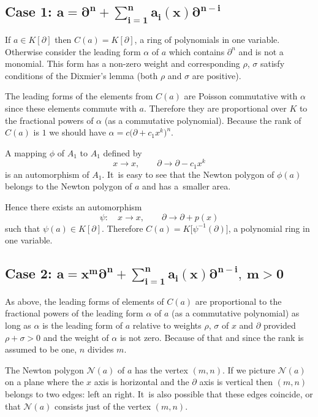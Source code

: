 \documentclass[pdftex]{sigma}
\numberwithin{equation}{section}
\newcommand{\de}{\partial}
\newcommand{\al}{\alpha}
\newcommand{\si}{\sigma}
\begin{document}
\subsection*{Case 1:
$\boldsymbol{\displaystyle a = \de^n + \sum\limits_{i=1}^n a_i(x)\de^{n-i}}$}

If $a \in K[\de]$ then $C(a) = K[\de]$, a ring of polynomials in one variable. Otherwise consider the leading form $\alpha$ of $a$ which contains $\de^n$ and is not a
monomial. This form has a non-zero weight and corresponding $\rho$, $\sigma$ satisfy conditions of the Dixmier's lemma (both $\rho$ and $\si$ are positive).

The leading forms of the elements from $C(a)$ are Poisson commutative with $\al$ since these elements commute with $a$. Therefore
they are proportional over $K$ to the fractional powers of $\alpha$ (as a
commutative polynomial). Because the rank of $C(a)$ is $1$ we should have $\alpha = c\big(\de + c_1x^k\big)^n$.

A mapping $\phi$ of $A_1$ to $A_1$ defined by
\[
x \rightarrow x, \qquad \de \rightarrow \de - c_1x^k
\]
is an automorphism of $A_1$. It~is easy to see that the Newton polygon of $\phi(a)$ belongs to the Newton polygon of $a$ and has a~smaller area.

Hence there exists an automorphism
\[
\psi\colon\quad x \rightarrow x, \qquad\de \rightarrow \de + p(x)
\]
such that $\psi(a) \in K[\de]$.
Therefore $C(a) = K\big[\psi^{-1}(\de)\big]$, a polynomial ring in one variable.

\subsection*{Case 2:
$\boldsymbol{\displaystyle a = x^m\de^n + \sum\limits_{i=1}^n a_i(x)\de^{n-i}, \ m > 0}$}

As above, the leading forms of elements of $C(a)$ are proportional to the
fractional powers of the leading form $\al$ of $a$ (as a commutative polynomial) as long as $\al$ is the
leading form of $a$ relative to weights $\rho$, $\sigma$ of $x$ and $\de$
provided $\rho + \sigma > 0$ and the weight of $\al$ is not zero. Because of
that and since the rank is assumed to be one, $n$ divides $m$.

The Newton polygon ${\mathcal N}(a)$ of $a$ has the vertex $(m,n)$.
If we picture ${\mathcal N}(a)$ on a plane where the $x$ axis is horizontal and the $\de$ axis is vertical then $(m,n)$ belongs to two edges: left an right.
It~is also possible that these edges coincide, or that ${\mathcal N}(a)$ consists just of the vertex $(m,n)$.
\end{document}
